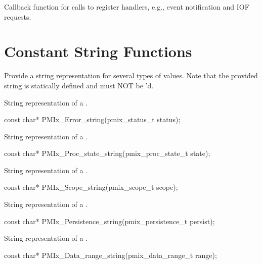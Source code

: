 \descr

Callback function for calls to register handlers, e.g., event notification and IOF requests.


\section{Constant String Functions}

Provide a string representation for several types of values.
Note that the provided string is statically defined and must NOT be 'd.

\summary
{}

String representation of a .

\cspecificstart
\begin{codepar}
const char*
PMIx_Error_string(pmix_status_t status);
\end{codepar}
\cspecificend

\summary
{}

String representation of a .

\cspecificstart
\begin{codepar}
const char*
PMIx_Proc_state_string(pmix_proc_state_t state);
\end{codepar}
\cspecificend

\summary
{}

String representation of a .

\cspecificstart
\begin{codepar}
const char*
PMIx_Scope_string(pmix_scope_t scope);
\end{codepar}
\cspecificend

\summary
{}

String representation of a .

\cspecificstart
\begin{codepar}
const char*
PMIx_Persistence_string(pmix_persistence_t persist);
\end{codepar}
\cspecificend

\summary
{}

String representation of a .

\cspecificstart
\begin{codepar}
const char*
PMIx_Data_range_string(pmix_data_range_t range);
\end{codepar}
\cspecificend


